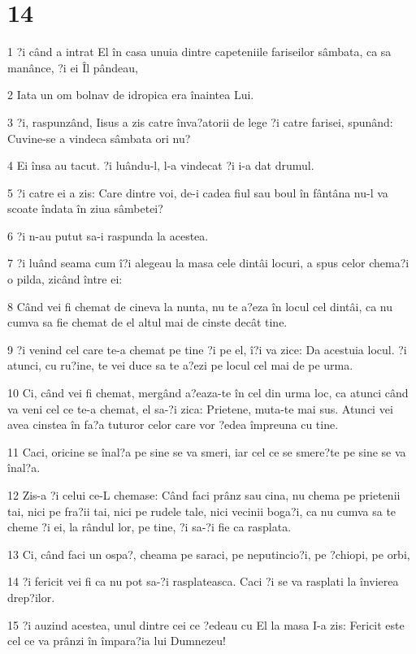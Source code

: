 \chapter{14}

\par 1 ?i când a intrat El în casa unuia dintre capeteniile fariseilor sâmbata, ca sa manânce, ?i ei Îl pândeau,
\par 2 Iata un om bolnav de idropica era înaintea Lui.
\par 3 ?i, raspunzând, Iisus a zis catre înva?atorii de lege ?i catre farisei, spunând: Cuvine-se a vindeca sâmbata ori nu?
\par 4 Ei însa au tacut. ?i luându-l, l-a vindecat ?i i-a dat drumul.
\par 5 ?i catre ei a zis: Care dintre voi, de-i cadea fiul sau boul în fântâna nu-l va scoate îndata în ziua sâmbetei?
\par 6 ?i n-au putut sa-i raspunda la acestea.
\par 7 ?i luând seama cum î?i alegeau la masa cele dintâi locuri, a spus celor chema?i o pilda, zicând între ei:
\par 8 Când vei fi chemat de cineva la nunta, nu te a?eza în locul cel dintâi, ca nu cumva sa fie chemat de el altul mai de cinste decât tine.
\par 9 ?i venind cel care te-a chemat pe tine ?i pe el, î?i va zice: Da acestuia locul. ?i atunci, cu ru?ine, te vei duce sa te a?ezi pe locul cel mai de pe urma.
\par 10 Ci, când vei fi chemat, mergând a?eaza-te în cel din urma loc, ca atunci când va veni cel ce te-a chemat, el sa-?i zica: Prietene, muta-te mai sus. Atunci vei avea cinstea în fa?a tuturor celor care vor ?edea împreuna cu tine.
\par 11 Caci, oricine se înal?a pe sine se va smeri, iar cel ce se smere?te pe sine se va înal?a.
\par 12 Zis-a ?i celui ce-L chemase: Când faci prânz sau cina, nu chema pe prietenii tai, nici pe fra?ii tai, nici pe rudele tale, nici vecinii boga?i, ca nu cumva sa te cheme ?i ei, la rândul lor, pe tine, ?i sa-?i fie ca rasplata.
\par 13 Ci, când faci un ospa?, cheama pe saraci, pe neputincio?i, pe ?chiopi, pe orbi,
\par 14 ?i fericit vei fi ca nu pot sa-?i rasplateasca. Caci ?i se va rasplati la învierea drep?ilor.
\par 15 ?i auzind acestea, unul dintre cei ce ?edeau cu El la masa I-a zis: Fericit este cel ce va prânzi în împara?ia lui Dumnezeu!
